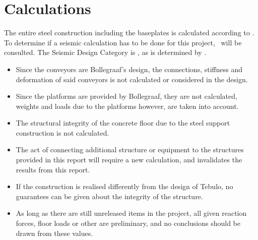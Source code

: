 \section{Calculations}
The entire steel construction including the baseplates is calculated according to \norm .\\
To determine if a seismic calculation has to be done for this project, \norm\ will be consulted. The Seismic Design Category is \EqClass , as is determined by \norm .
\begin{itemize}

\item	Since the conveyors are Bollegraaf's design, the connections, stiffness and deformation of said conveyors is not calculated or considered in the design.
\item	Since the platforms are provided by Bollegraaf, they are not calculated, weights and loads due to the platforms however, are taken into account.
\item	The structural integrity of the concrete floor due to the steel support construction is not calculated.
\item	The act of connecting additional structure or equipment to the structures provided in this report will require a new calculation, and invalidates the results from this report.
\item	If the construction is realised differently from the design of Tebulo, no guarantees can be given about the integrity of the structure.
\item	As long as there are still unreleased items in the project, all given reaction forces, floor loads or other are preliminary, and no conclusions should be drawn from these values.
\end{itemize}

